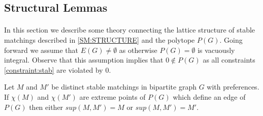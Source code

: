 \subsection{Structural Lemmas}
\paragraph{}
In this section we describe some theory connecting the lattice structure of stable matchings described in \ref{SM:STRUCTURE} and the polytope $P(G)$. Going forward we assume that $E(G) \neq \emptyset$ as otherwise $P(G) = \emptyset$ is vacuously integral. Observe that this assumption implies that $0 \not\in P(G)$ as all constraints \ref{constraint:stab} are violated by $0$.
\begin{lemma}\label{lemma:all-same}
Let $M$ and $M'$ be distinct stable matchings in bipartite graph $G$ with preferences. If $\chi(M)$ and $\chi(M')$ are extreme points of $P(G)$ which define an edge of $P(G)$ then either $sup(M,M') = M$ or $sup(M,M') = M'$.
\end{lemma}
